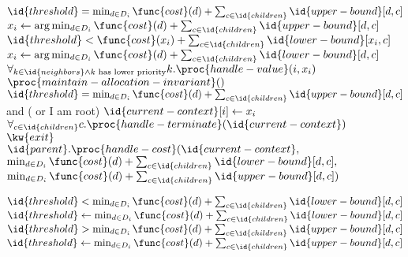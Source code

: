 \begin{SCfigure}
  \begin{minipage}{1.0\linewidth}
    \begin{codebox}
      \li \If $\id{threshold} = \min_{d \in D_i} \func{cost}(d) + \sum_{c
        \in \id{children}} \id{upper-bound}[d,c]$
      \li \Then $x_i \gets \arg \min_{d \in D_i} \func{cost}(d) + \sum_{c
        \in \id{children}} \id{upper-bound}[d,c]$
      \li \ElseIf $\id{threshold} < \func{cost}(x_i) + \sum_{c \in
        \id{children}} \id{lower-bound}[x_i,c]$
      \li \Then $x_i \gets \arg \min_{d \in D_i} \func{cost}(d) + \sum_{c \in
        \id{children}} \id{lower-bound}[d,c]$
          \End
      \li $\forall_{k \in \id{neighbors} \wedge k \text{ has lower
          priority}} k.\proc{handle-value}(i,x_i)$
      \li $\proc{maintain-allocation-invariant}()$
      \li \If $\id{threshold} = \min_{d \in D_i} \func{cost}(d) + \sum_{c
        \in \id{children}} \id{upper-bound}[d,c]$ and
      \zi \>\>\>      ( or I am root)
      \li \Then $\id{current-context}[i] \gets x_i$
      \li       $\forall_{c \in \id{children}} c.\proc{handle-terminate}(\id{current-context})$
      \li       $\kw{exit}$
          \End
      \li $\id{parent}.\proc{handle-cost}(\id{current-context},$
      \zi \>\>$\min_{d \in D_i} \func{cost}(d) + \sum_{c \in
        \id{children}} \id{lower-bound}[d,c],$
      \zi \>\>$\min_{d \in D_i} \func{cost}(d) + \sum_{c \in \id{children}}
      \id{upper-bound}[d,c])$
    \end{codebox}
    \begin{codebox}
      \li \If $\id{threshold} < \min_{d \in D_i} \func{cost}(d) + \sum_{c \in
        \id{children}} \id{lower-bound}[d,c]$
      \li \Then $\id{threshold} \gets \min_{d \in D_i} \func{cost}(d) + \sum_{c \in \id{children}} \id{lower-bound}[d,c]$
          \End
      \li \If $\id{threshold} > \min_{d \in D_i} \func{cost}(d) + \sum_{c
        \in \id{children}} \id{upper-bound}[d,c]$
      \li \Then $\id{threshold} \gets \min_{d \in D_i} \func{cost}(d) + \sum_{c
        \in \id{children}} \id{upper-bound}[d,c]$
          \End
    \end{codebox}
\end{minipage}
\end{SCfigure}
